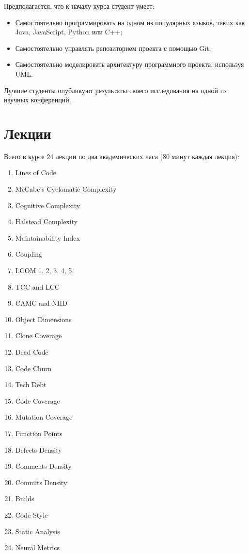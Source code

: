 \documentclass[nobrand,anonymous,nodate,nosecurity]{huawei}
\begin{document}
Предполагается, что к началу курса студент умеет:
\begin{itemize}
    \item Самостоятельно программировать на одном из популярных языков, таких как Java, JavaScript, Python или C++;
    \item Самостоятельно управлять репозиторием проекта с помощью Git;
    \item Самостоятельно моделировать архитектуру программного проекта, используя UML.
\end{itemize}

Лучшие студенты опубликуют результаты своего исследования на одной из научных конференций.

\section{Лекции}

Всего в курсе 24 лекции по два академических часа (80 минут каждая лекция):
\begin{enumerate}
    \setlength\itemsep{0em}
    \item Lines of Code
    \item McCabe's Cyclomatic Complexity
    \item Cognitive Complexity
    \item Halstead Complexity
    \item Maintainability Index
    \item Coupling
    \item LCOM 1, 2, 3, 4, 5
    \item TCC and LCC
    \item CAMC and NHD
    \item Object Dimensions
    \item Clone Coverage
    \item Dead Code
    \item Code Churn
    \item Tech Debt
    \item Code Coverage
    \item Mutation Coverage
    \item Function Points
    \item Defects Density
    \item Comments Density
    \item Commits Density
    \item Builds
    \item Code Style
    \item Static Analysis
    \item Neural Metrics
\end{enumerate}
\end{document}
